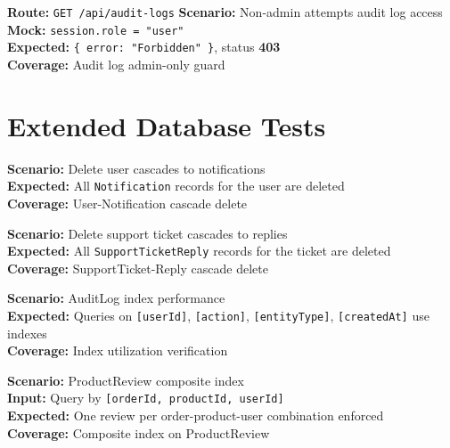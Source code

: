 \documentclass[12pt,a4paper]{report}
\newcommand{\pone}{\textbf{\color{p1red}P1}}
\newcommand{\ptwo}{\textbf{\color{p2orange}P2}}
\newcommand{\pthree}{\textbf{\color{p3blue}P3}}
\begin{document}
\begin{tcolorbox}[criticalbox,title={RBAC-008 \hfill \pone\ --- Audit Log Access}]
\textbf{Route:} \texttt{GET /api/audit-logs} \quad \textbf{Scenario:} Non-admin attempts audit log access \\
\textbf{Mock:} \texttt{session.role = "user"} \\
\textbf{Expected:} \texttt{\{ error: "Forbidden" \}}, status \textbf{403} \\
\textbf{Coverage:} Audit log admin-only guard
\end{tcolorbox}

\section{Extended Database Tests}

\begin{tcolorbox}[testbox,title={DB-006 \hfill \ptwo}]
\textbf{Scenario:} Delete user cascades to notifications \\
\textbf{Expected:} All \texttt{Notification} records for the user are deleted \\
\textbf{Coverage:} User-Notification cascade delete
\end{tcolorbox}

\begin{tcolorbox}[testbox,title={DB-007 \hfill \ptwo}]
\textbf{Scenario:} Delete support ticket cascades to replies \\
\textbf{Expected:} All \texttt{SupportTicketReply} records for the ticket are deleted \\
\textbf{Coverage:} SupportTicket-Reply cascade delete
\end{tcolorbox}

\begin{tcolorbox}[testbox,title={DB-008 \hfill \pthree}]
\textbf{Scenario:} AuditLog index performance \\
\textbf{Expected:} Queries on \texttt{[userId]}, \texttt{[action]}, \texttt{[entityType]}, \texttt{[createdAt]} use indexes \\
\textbf{Coverage:} Index utilization verification
\end{tcolorbox}

\begin{tcolorbox}[testbox,title={DB-009 \hfill \ptwo}]
\textbf{Scenario:} ProductReview composite index \\
\textbf{Input:} Query by \texttt{[orderId, productId, userId]} \\
\textbf{Expected:} One review per order-product-user combination enforced \\
\textbf{Coverage:} Composite index on ProductReview
\end{tcolorbox}
\end{document}
